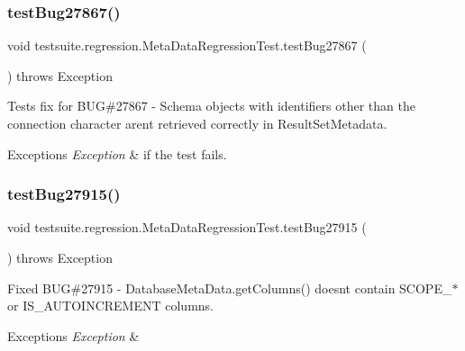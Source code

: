 \subsubsection{\texorpdfstring{test\+Bug27867()}{testBug27867()}}
{\footnotesize\ttfamily void testsuite.\+regression.\+Meta\+Data\+Regression\+Test.\+test\+Bug27867 (\begin{DoxyParamCaption}{ }\end{DoxyParamCaption}) throws Exception}

Tests fix for B\+UG\#27867 -\/ Schema objects with identifiers other than the connection character aren\textquotesingle{}t retrieved correctly in Result\+Set\+Metadata.


\begin{DoxyExceptions}{Exceptions}
{\em Exception} & if the test fails. \\
\hline
\end{DoxyExceptions}
\mbox{\label{classtestsuite_1_1regression_1_1_meta_data_regression_test_a32361bc11ddd1b2990adfa15697e27ae}} 
\subsubsection{\texorpdfstring{test\+Bug27915()}{testBug27915()}}
{\footnotesize\ttfamily void testsuite.\+regression.\+Meta\+Data\+Regression\+Test.\+test\+Bug27915 (\begin{DoxyParamCaption}{ }\end{DoxyParamCaption}) throws Exception}

Fixed B\+UG\#27915 -\/ Database\+Meta\+Data.\+get\+Columns() doesn\textquotesingle{}t contain S\+C\+O\+P\+E\+\_\+$\ast$ or I\+S\+\_\+\+A\+U\+T\+O\+I\+N\+C\+R\+E\+M\+E\+NT columns.


\begin{DoxyExceptions}{Exceptions}
{\em Exception} & \\
\hline
\end{DoxyExceptions}
\mbox{\label{classtestsuite_1_1regression_1_1_meta_data_regression_test_a360ac39f54be19d70c9d43f584bc6f0f}} 
